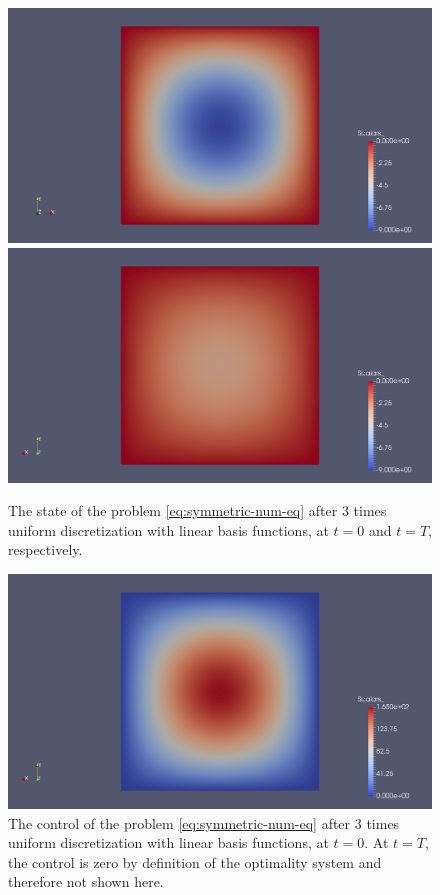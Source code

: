 \documentclass[../thesis.tex]{subfiles}
\begin{document}
\begin{figure}[htpb]
\centering
\includegraphics[width=\textwidth]{Images/symm-3r-y-0t.png}
\includegraphics[width=\textwidth]{Images/symm-3r-y-Tt.png}
\caption{The state of the problem \cref{eq:symmetric-num-eq} after 3 times uniform discretization with linear basis functions, at $t = 0$ and $t = T$, respectively.}
\label{fig:symm-3r-y}
\end{figure}
\begin{figure}[htpb]
\centering
\includegraphics[width=\textwidth]{Images/symm-3r-u-0t.png}
\caption{The control of the problem \cref{eq:symmetric-num-eq} after 3 times uniform discretization with linear basis functions, at $t = 0$. At $t = T$, the control is zero by definition of the optimality system and therefore not shown here.}
\label{fig:symm-3r-u}
\end{figure}
\end{document}
